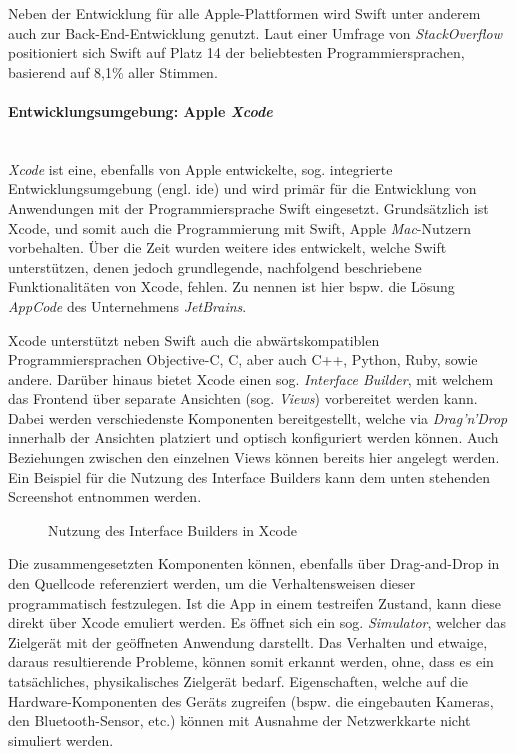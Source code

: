 Neben der Entwicklung für alle Apple-Plattformen wird Swift unter anderem auch zur Back-End-Entwicklung genutzt. Laut einer Umfrage von \textit{StackOverflow} positioniert sich Swift auf Platz 14 der beliebtesten Programmiersprachen, basierend auf 8,1\% aller Stimmen.

\paragraph{Entwicklungsumgebung: Apple \textit{Xcode}}\mbox{}\\
\textit{Xcode} ist eine, ebenfalls von Apple entwickelte, sog. integrierte Entwicklungsumgebung (engl. \ac{ide}) und wird primär für die Entwicklung von Anwendungen mit der Programmiersprache Swift eingesetzt. Grundsätzlich ist Xcode, und somit auch die Programmierung mit Swift, Apple \textit{Mac}-Nutzern vorbehalten. Über die Zeit wurden weitere \acp{ide} entwickelt, welche Swift unterstützen, denen jedoch grundlegende, nachfolgend beschriebene Funktionalitäten von Xcode, fehlen. Zu nennen ist hier bspw. die Lösung \textit{AppCode} des Unternehmens \textit{JetBrains}.

Xcode unterstützt neben Swift auch die abwärtskompatiblen Programmiersprachen Objective-C, C, aber auch C++, Python, Ruby, sowie andere. Darüber hinaus bietet Xcode einen sog. \textit{Interface Builder}, mit welchem das Frontend über separate Ansichten (sog. \textit{Views}) vorbereitet werden kann. Dabei werden verschiedenste Komponenten bereitgestellt, welche via \textit{Drag'n'Drop} innerhalb der Ansichten platziert und optisch konfiguriert werden können. Auch Beziehungen zwischen den einzelnen Views können bereits hier angelegt werden. Ein Beispiel für die Nutzung des Interface Builders kann dem unten stehenden Screenshot entnommen werden.

\begin{figure}[h!]
	\centering
	\caption{Nutzung des Interface Builders in Xcode}
\end{figure}

Die zusammengesetzten Komponenten können, ebenfalls über Drag-and-Drop in den Quellcode referenziert werden, um die Verhaltensweisen dieser programmatisch festzulegen. Ist die App in einem testreifen Zustand, kann diese direkt über Xcode emuliert werden. Es öffnet sich ein sog. \textit{Simulator}, welcher das Zielgerät mit der geöffneten Anwendung darstellt. Das Verhalten und etwaige, daraus resultierende Probleme, können somit erkannt werden, ohne, dass es ein tatsächliches, physikalisches Zielgerät bedarf. Eigenschaften, welche auf die Hardware-Komponenten des Geräts zugreifen (bspw. die eingebauten Kameras, den Bluetooth-Sensor, etc.) können mit Ausnahme der Netzwerkkarte nicht simuliert werden.


